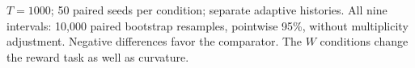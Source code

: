 \par\medskip
\noindent\begin{minipage}{\linewidth}
\raggedright
$T=1000$; 50 paired seeds per condition; separate adaptive histories.
All nine intervals: 10,000 paired bootstrap resamples, pointwise 95\%,
without multiplicity adjustment. Negative differences favor the comparator.
The $W$ conditions change the reward task as well as curvature.
\end{minipage}
